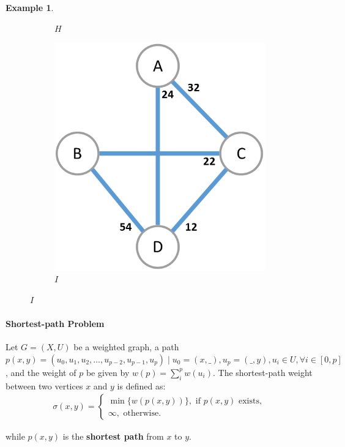 \documentclass[12pt]{article}
\newtheorem{example}{Example}[section]
\begin{document}
\begin{example}
\begin{figure}[H]
\begin{subfigure}{.33\linewidth}
			\caption{$H$}
			\label{fig:example-graph-nn}
		\end{subfigure}%
		\begin{subfigure}{.33\linewidth}
			\centering
			\includegraphics[width=.8\linewidth]{graphs/example-graph-en}
			\caption{$I$}
			\label{fig:example-graph-en}
		\end{subfigure}
	\end{figure}
\end{example}

\paragraph{Shortest-path Problem \cite{cor2011}}

Let $G=(X, U)$ be a weighted graph, a path $p(x, y)=(u_0, u_1, u_2, \dots, u_{p-2}, u_{p-1}, u_{p}) \mid u_0 = (x, \_), u_p = (\_, y), u_i \in U, \forall i \in [0, p]$, and the weight of $p$ be given by $w(p) = \sum_i^p w(u_i)$. The shortest-path weight between two vertices $x$ and $y$ is defined as:
\begin{align*}
	\sigma(x, y) = \begin{cases}
		\min \{w(p(x, y))\}, \text{ if $p(x, y)$ exists}, \\
		\infty, \text{ otherwise.}
	\end{cases}
\end{align*}

while $p(x, y)$ is the \textbf{shortest path} from $x$ to $y$.
\end{document}
